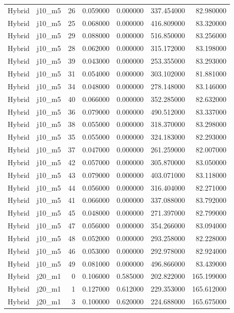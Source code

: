 \begin{tabular}{llrrrrr}
Hybrid & j10_m5 & 26 & 0.059000 & 0.000000 & 337.454000 & 82.980000 \\
Hybrid & j10_m5 & 25 & 0.068000 & 0.000000 & 416.809000 & 83.320000 \\
Hybrid & j10_m5 & 29 & 0.088000 & 0.000000 & 516.850000 & 83.256000 \\
Hybrid & j10_m5 & 28 & 0.062000 & 0.000000 & 315.172000 & 83.198000 \\
Hybrid & j10_m5 & 39 & 0.043000 & 0.000000 & 253.355000 & 83.293000 \\
Hybrid & j10_m5 & 31 & 0.054000 & 0.000000 & 303.102000 & 81.881000 \\
Hybrid & j10_m5 & 34 & 0.048000 & 0.000000 & 278.148000 & 83.146000 \\
Hybrid & j10_m5 & 40 & 0.066000 & 0.000000 & 352.285000 & 82.632000 \\
Hybrid & j10_m5 & 36 & 0.079000 & 0.000000 & 490.512000 & 83.337000 \\
Hybrid & j10_m5 & 38 & 0.055000 & 0.000000 & 318.370000 & 83.298000 \\
Hybrid & j10_m5 & 35 & 0.055000 & 0.000000 & 324.183000 & 82.293000 \\
Hybrid & j10_m5 & 37 & 0.047000 & 0.000000 & 261.259000 & 82.007000 \\
Hybrid & j10_m5 & 42 & 0.057000 & 0.000000 & 305.870000 & 83.050000 \\
Hybrid & j10_m5 & 43 & 0.079000 & 0.000000 & 403.071000 & 83.118000 \\
Hybrid & j10_m5 & 44 & 0.056000 & 0.000000 & 316.404000 & 82.271000 \\
Hybrid & j10_m5 & 41 & 0.066000 & 0.000000 & 337.088000 & 83.792000 \\
Hybrid & j10_m5 & 45 & 0.048000 & 0.000000 & 271.397000 & 82.799000 \\
Hybrid & j10_m5 & 47 & 0.056000 & 0.000000 & 354.266000 & 83.094000 \\
Hybrid & j10_m5 & 48 & 0.052000 & 0.000000 & 293.258000 & 82.228000 \\
Hybrid & j10_m5 & 46 & 0.053000 & 0.000000 & 292.978000 & 82.924000 \\
Hybrid & j10_m5 & 49 & 0.081000 & 0.000000 & 496.866000 & 83.439000 \\
Hybrid & j20_m1 & 0 & 0.106000 & 0.585000 & 202.822000 & 165.199000 \\
Hybrid & j20_m1 & 1 & 0.127000 & 0.612000 & 229.353000 & 165.612000 \\
Hybrid & j20_m1 & 3 & 0.100000 & 0.620000 & 224.688000 & 165.675000 \\

\end{tabular}
